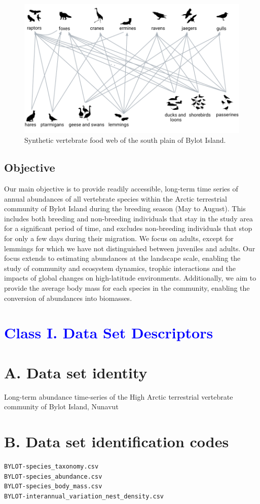 \documentclass[a4paper,twoside,12pt]{article}
\begin{document}
\begin{figure}[H]
\centering
\includegraphics[width=0.75\linewidth]{figures/food_web.pdf} 
\caption{Synthetic vertebrate food web of the south plain of Bylot Island.}
\label{figure:food_web}
\end{figure}

\subsection*{Objective}
Our main objective is to provide readily accessible, long-term time series of annual abundances of all vertebrate species within the Arctic terrestrial community of Bylot Island during the breeding season (May to August). This includes both breeding and non-breeding individuals that stay in the study area for a significant period of time, and excludes non-breeding individuals that stop for only a few days during their migration. We focus on adults, except for lemmings for which we have not distinguished between juveniles and adults. Our focus extends to estimating abundances at the landscape scale, enabling the study of community and ecosystem dynamics, trophic interactions and the impacts of global changes on high-latitude environments. Additionally, we aim to provide the average body mass for each species in the community, enabling the conversion of abundances into biomasses.
\newpage
\section*{\textcolor{Blue}{Class I. Data Set Descriptors}}
    \section*{A. Data set identity} Long-term abundance time-series of the High Arctic terrestrial vertebrate community of Bylot Island, Nunavut
    \section*{B. Data set identification codes}
     \texttt{BYLOT-species\_taxonomy.csv}\\
     \texttt{BYLOT-species\_abundance.csv}\\
     \texttt{BYLOT-species\_body\_mass.csv}\\
     \texttt{BYLOT-interannual\_variation\_nest\_density.csv}\\
     
\end{document}
